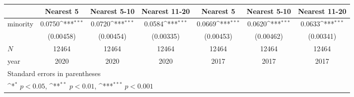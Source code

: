 {
\def\sym#1{\ifmmode^{#1}\else\(^{#1}\)\fi}
\begin{tabular}{l*{6}{c}}
\hline\hline
            &\multicolumn{1}{c}{Nearest 5}&\multicolumn{1}{c}{Nearest 5-10}&\multicolumn{1}{c}{Nearest 11-20}&\multicolumn{1}{c}{Nearest 5}&\multicolumn{1}{c}{Nearest 5-10}&\multicolumn{1}{c}{Nearest 11-20}\\
\hline
minority    &      0.0750\sym{***}&      0.0720\sym{***}&      0.0584\sym{***}&      0.0669\sym{***}&      0.0620\sym{***}&      0.0633\sym{***}\\
            &   (0.00458)         &   (0.00454)         &   (0.00335)         &   (0.00453)         &   (0.00462)         &   (0.00341)         \\
\hline
\(N\)       &       12464         &       12464         &       12464         &       12464         &       12464         &       12464         \\
year        &        2020         &        2020         &        2020         &        2017         &        2017         &        2017         \\
\hline\hline
\multicolumn{7}{l}{\footnotesize Standard errors in parentheses}\\
\multicolumn{7}{l}{\footnotesize \sym{*} \(p<0.05\), \sym{**} \(p<0.01\), \sym{***} \(p<0.001\)}\\
\end{tabular}
}
